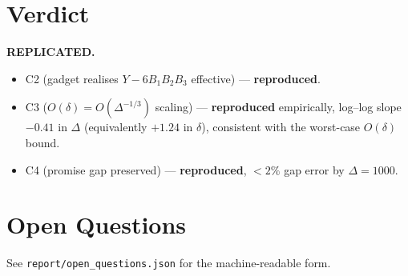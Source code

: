 \documentclass[11pt]{article}
\begin{document}
\section{Verdict}

\textbf{REPLICATED.}
\begin{itemize}
    \item C2 (gadget realises $Y - 6 B_1 B_2 B_3$ effective) — \textbf{reproduced}.
    \item C3 ($O(\delta) = O(\Delta^{-1/3})$ scaling) — \textbf{reproduced}
          empirically, log--log slope $-0.41$ in $\Delta$
          (equivalently $+1.24$ in $\delta$), consistent with the
          worst-case $O(\delta)$ bound.
    \item C4 (promise gap preserved) — \textbf{reproduced}, $<2\%$ gap
          error by $\Delta = 1000$.
\end{itemize}

\section*{Open Questions}
See \texttt{report/open\_questions.json} for the machine-readable form.
\end{document}
